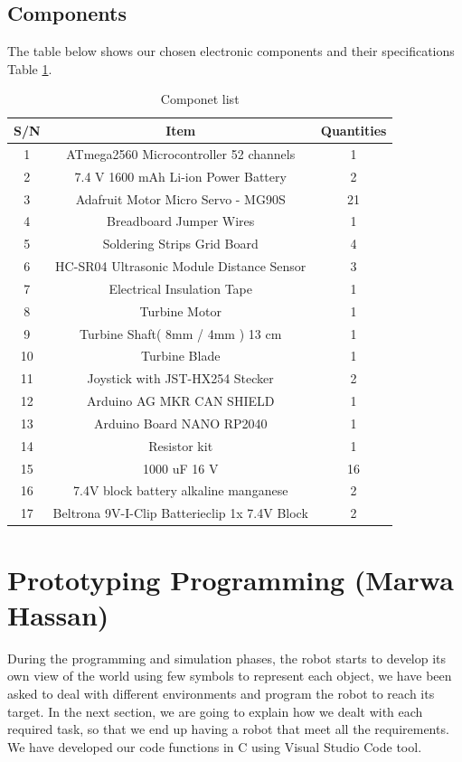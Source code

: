 \documentclass[10pt,journal,compsoc]{IEEEtran}
\begin{document}
\subsection{Components}

The table below shows our chosen electronic components and their specifications Table \ref{componetlist}. \cite{conrad}

\begin{table}[ht]
\centering
\begin{tabular}{|c|c|c|}
\hline
S/N & Item & Quantities  \\ 
\hline
\hline
1 & ATmega2560 Microcontroller 52 channels & 1 \\
2 & 7.4 V 1600 mAh Li-ion Power Battery & 2 \\
3 & Adafruit Motor Micro Servo - MG90S  & 21  \\
4 & Breadboard Jumper Wires  & 1  \\
5 & Soldering Strips Grid Board & 4  \\
6 & HC-SR04 Ultrasonic Module Distance Sensor & 3  \\
7 & Electrical Insulation Tape &  1 \\
8 & Turbine Motor &  1 \\
9 & Turbine Shaft( 8mm / 4mm ) 13 cm &  1 \\
10 & Turbine Blade &  1 \\
11 & Joystick with JST-HX254 Stecker & 2 \\
12 & Arduino AG MKR CAN SHIELD &  1 \\
13 & Arduino Board NANO RP2040  &  1 \\
14 & Resistor kit &  1 \\
15 & 1000 uF 16 V &  16 \\
16 & 7.4V block battery alkaline manganese  &  2 \\
17 & Beltrona 9V-I-Clip Batterieclip 1x 7.4V Block  &  2 \\
\hline
\end{tabular}
\caption{Componet list}
\label{componetlist}
\end{table}




\section{Prototyping Programming (Marwa Hassan)}

During the programming and simulation phases, the robot starts to develop its own view of the world using  few symbols to represent each object, we have been  asked to deal with different environments and program the robot to reach its target.
In the next section, we are going to explain how we dealt with each required task, so that we end up having a robot that meet all the requirements. We have developed our code functions in C using Visual Studio Code tool. 
\end{document}
